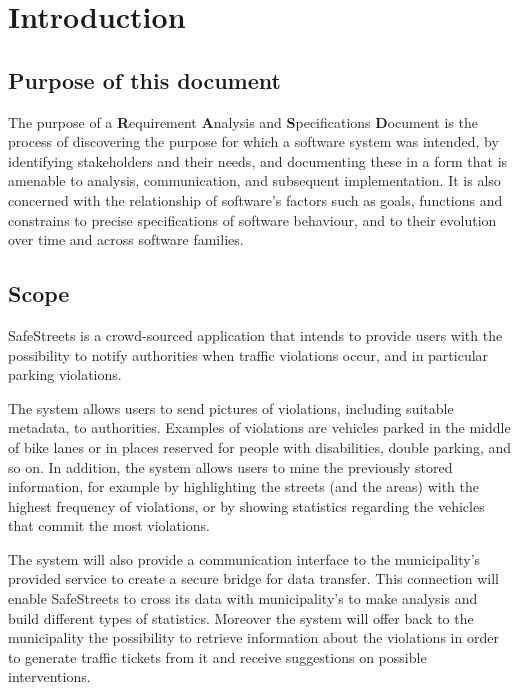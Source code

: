 \section{Introduction}
\subsection{Purpose of this document}
The purpose of a \textbf{R}equirement \textbf{A}nalysis and \textbf{S}pecifications \textbf{D}ocument is the process of discovering the purpose for which a software system was intended, by identifying stakeholders and their needs, and documenting these in a form that is amenable to analysis, communication, and subsequent implementation. \cite{RE} It is also concerned with the relationship of software's factors such as goals, functions and constrains to precise specifications of software behaviour, and to their evolution over time and across software families. \cite{Zave}

\subsection{Scope}

	SafeStreets is a crowd-­sourced application that intends to provide users with the possibility to notify authorities when traffic violations occur, and in particular parking violations. 

	The system allows users to send pictures of violations, including suitable metadata, to authorities. Examples of violations are vehicles parked in the middle of bike lanes or in places reserved for people with disabilities, double parking, and so on. In addition, the system allows users to mine the previously stored information, for example by highlighting the streets (and the areas) with the highest frequency of violations, or by showing statistics regarding the vehicles that commit the most violations.
	
	The system will also provide a communication interface to the municipality's provided service to create a secure bridge for data transfer. This connection will enable SafeStreets to cross its data with municipality's to make analysis and build different types of statistics. Moreover the system will offer back to the municipality the possibility to retrieve information about the violations in order to generate traffic tickets from it and receive suggestions on possible interventions. \cite{Assignments}
	
